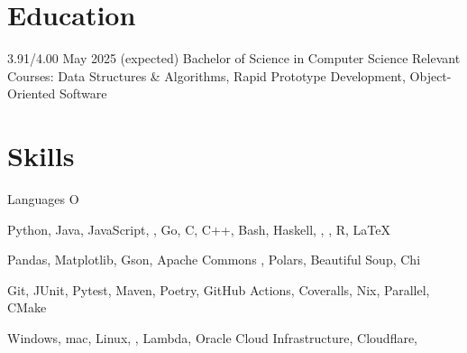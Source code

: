 \section{Education}
\begin{doutline}
      3.91/4.00
    \hfill May 2025 (expected)
        \2 Bachelor of Science in Computer Science
        \2 Relevant Courses: Data Structures \& Algorithms, Rapid Prototype Development, Object-Oriented Software
\end{doutline}

\section{Skills}
\begin{labeling}{Languages O}
    \item [Languages] Python, Java, JavaScript, , Go, C, C++, Bash, Haskell, , , R, \LaTeX
    \item [Libraries] Pandas, Matplotlib, Gson, Apache Commons , Polars, Beautiful Soup, Chi
    \item [Tools] Git, JUnit, Pytest, Maven, Poetry, GitHub Actions, Coveralls, Nix,  Parallel, CMake
    \item [Platforms] Windows, mac, Linux, ,  Lambda, Oracle Cloud Infrastructure, Cloudflare, 
\end{labeling}

